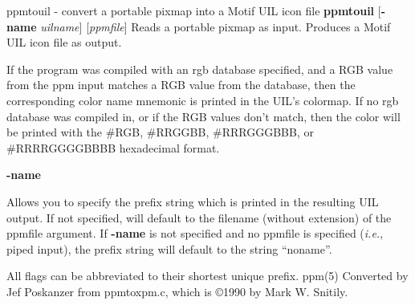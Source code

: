 %

\newpage
%

ppmtouil - convert a portable pixmap into a Motif UIL icon file
{\bf ppmtouil}
{\rm [}{\bf -name}
{\it uilname}{\rm ]}
{\rm [}{\it ppmfile}{\rm ]}
Reads a portable pixmap as input.
Produces a Motif UIL icon file as output.
\par
If the program was compiled with an rgb database specified, and
a RGB value from the ppm input matches a RGB value from the database,
then the corresponding color name mnemonic is printed in the UIL's colormap.
If no rgb database was compiled in, or if the RGB values don't match,
then the color
will be printed with the \#RGB, \#RRGGBB, \#RRRGGGBBB, or \#RRRRGGGGBBBB
hexadecimal format.
\begin{TPlist}{{\bf -name}}
\item[{{\bf -name}}]
Allows you to specify the prefix string which is printed
in the resulting UIL output.  If not specified, will default to the
filename (without extension) of the ppmfile argument.
If
{\bf -name}
is not specified and no ppmfile
is specified ({\it i.e.}, piped input), the prefix string will default to
the string ``noname''.
\end{TPlist}

\par
All flags can be abbreviated to their shortest unique prefix.
ppm(5)
Converted by Jef Poskanzer from ppmtoxpm.c, which is
\copyright 1990 by Mark W. Snitily.
%
 
